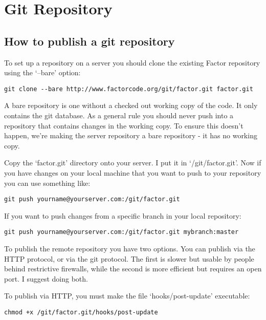 \chapter{Git Repository}\label{git}

\section{How to publish a git repository}

To set up a repository on a server you should clone the existing
Factor repository using the `--bare' option:

\begin{verbatim}
git clone --bare http://www.factorcode.org/git/factor.git factor.git
\end{verbatim}

A bare repository is one without a checked out working copy of the
code. It only contains the git database. As a general rule you should
never push into a repository that contains changes in the working
copy. To ensure this doesn't happen, we're making the server
repository a bare repository - it has no working copy.

Copy the `factor.git' directory onto your server. I put it in
`/git/factor.git'. Now if you have changes on your local machine that
you want to push to your repository you can use something like:

\begin{verbatim}
git push yourname@yourserver.com:/git/factor.git
\end{verbatim}

If you want to push changes from a specific branch in your local
repository:

\begin{verbatim}
git push yourname@yourserver.com:/git/factor.git mybranch:master
\end{verbatim}

To publish the remote repository you have two options. You can publish
via the HTTP protocol, or via the git protocol. The first is slower
but usable by people behind restrictive firewalls, while the second is
more efficient but requires an open port. I suggest doing both.

To publish via HTTP, you must make the file `hooks/post-update'
executable:

\begin{verbatim}
chmod +x /git/factor.git/hooks/post-update
\end{verbatim}

